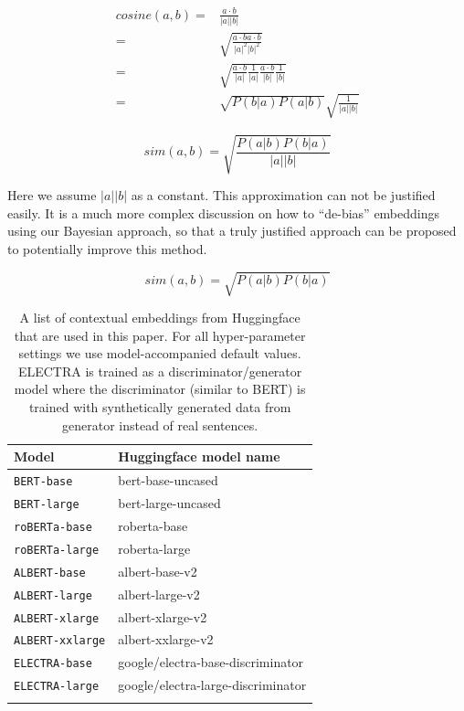 \documentclass[letterpaper]{article} %
\begin{document}
\begin{equation}
\begin{split}
cosine(a,b) =& \frac{a \cdot b}{|a||b|} \\
=& \sqrt{\frac{a \cdot b  a \cdot b }{|a|^2|b|^2}} \\
=& \sqrt{\frac{a \cdot b }{|a|}  \frac{1}{|a|} \frac{ a \cdot b }{|b|}\frac{1}{|b|}} \\
=&\sqrt{P(b|a) P(a|b)}\sqrt{\frac{1}{|a||b|}}
\end{split}
\end{equation}

\begin{equation}
    sim(a,b) = \sqrt{\frac{P(a|b)P(b|a)}{|a||b|}}
\end{equation}

Here we assume $|a||b|$ as a constant. This approximation can not be justified easily. It is a much more complex discussion on how to ``de-bias'' embeddings using our Bayesian approach, so that a truly justified approach can be proposed to potentially improve this method.

\begin{equation}
sim(a,b) = \sqrt{P(a|b)P(b|a)}
\end{equation}



\begin{table}[!]
\centering
\begin{tabular}{l|l}
\textbf{Model} & \textbf{Huggingface model name}  \\
\hline
\texttt{BERT-base}     & bert-base-uncased  \\
\texttt{BERT-large}     &  bert-large-uncased \\
\texttt{roBERTa-base}     &  roberta-base \\
\texttt{roBERTa-large}     & roberta-large \\
\texttt{ALBERT-base}     &  albert-base-v2 \\
\texttt{ALBERT-large}     &  albert-large-v2 \\
\texttt{ALBERT-xlarge}     &  albert-xlarge-v2\\
\texttt{ALBERT-xxlarge}     & albert-xxlarge-v2 \\
\texttt{ELECTRA-base}     & google/electra-base-discriminator \\
\texttt{ELECTRA-large}     & google/electra-large-discriminator \\

     & 
\end{tabular}
\caption{A list of contextual embeddings from Huggingface that are used in this paper. For all hyper-parameter settings we use model-accompanied default values. ELECTRA is trained as a discriminator/generator model where the discriminator (similar to BERT) is trained with synthetically generated data from generator instead of real sentences.}
\label{tab:modellist}
\end{table}
\end{document}
